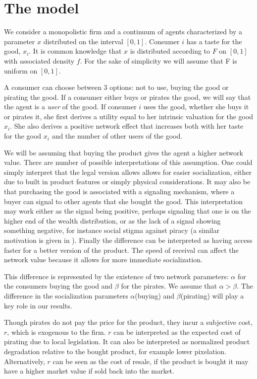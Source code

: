 \documentclass[12pt]{article}
\numberwithin{equation}{section}
\begin{document}
\section{The model}

We consider a monopolistic firm and a continuum of agents characterized by a parameter $x$ distributed on the interval $[0,1]$. Consumer $i$ has a taste for the good, $x_i$. It is common knowledge that $x$ is distributed according to $F$ on $[0,1]$ with associated density $f$. For the sake of simplicity we will assume that F is uniform on $[0,1]$. 

A consumer can choose between 3 options: not to use, buying the good or pirating the good. If a consumer either buys or pirates the good, we will say that the agent is a \textit{user} of the good. If consumer $i$ uses the good, whether she buys it or pirates it, she first derives a utility equal to her intrinsic valuation for the good $x_i$. She also derives a positive network effect that increases both with her taste for the good $x_i$ and the number of other users of the good. 

We will be assuming that buying the product gives the agent a higher network value. There are number of possible interpretations of this assumption. One could simply interpret that the legal version allows allows for easier socialization, either due to built in product features or simply physical considerations. It may also be that purchasing the good is associated with a signaling mechanism, where a buyer can signal to other agents that she bought the good. This interpretation may work either as the signal being positive, perhaps signaling that one is on the higher end of the wealth distribution, or as the lack of a signal showing something negative, for instance social stigma against piracy (a similar motivation is given in \cite{CRP91}). Finally the difference can be interpreted as having access faster for a better version of the product. The speed of receival can affect the network value because it allows for more immediate socialization. 

This difference is represented by the existence of two network parameters: $\alpha$ for the consumers buying the good and $\beta$ for the pirates. We assume that $\alpha > \beta$. The difference in the socialization parameters $\alpha$(buying) and $\beta$(pirating) will play a key role in our results. 

Though pirates do not pay the price for the product, they incur a subjective cost, $r$, which is exogenous to the firm. $r$ can be interpreted as the expected cost of pirating due to local legislation. It can also be interpreted as normalized product degradation relative to the bought product, for example lower pixelation. Alternatively, $r$ can be seen as the cost of resale, if the product is bought it may have a higher market value if sold back into the market. 
\end{document}
